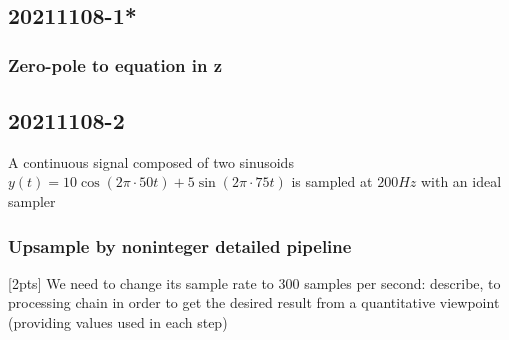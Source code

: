 
\pagebreak\subsection{20211108-1*}

    \subsubsection{Zero-pole to equation in z}


\pagebreak\subsection{20211108-2}
    A continuous signal composed of two sinusoids $y(t)=10\cos(2\pi\cdot 50t)+5\sin(2\pi\cdot 75t)$ is sampled at $200Hz$ with an ideal sampler
    
    \subsubsection{Upsample by noninteger detailed pipeline}
    [2pts] We need to change its sample rate to 300 samples per second: describe, to processing chain in order to get the desired result from a quantitative viewpoint (providing values used in each step)

